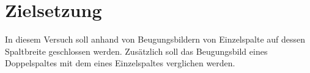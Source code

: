 \section{Zielsetzung}

\label{sec:Zielsetzung}

In diesem Versuch soll anhand von Beugungsbildern von Einzelspalte auf dessen Spaltbreite geschlossen werden. Zusätzlich soll
das Beugungsbild eines Doppelspaltes mit dem eines Einzelspaltes verglichen werden.
